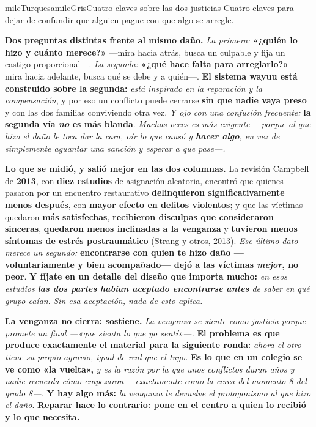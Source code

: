 \documentclass[11pt,letterpaper]{article}
\newcommand{\milcpaso}[3]{%
\Needspace{4\baselineskip}%
\begin{tcolorbox}[enhanced,colback=white,colframe=milcLinea,arc=1.5mm,boxrule=.9pt,
  left=14mm,right=4mm,top=3mm,bottom=3mm,before skip=4pt,after skip=4pt,
  fontupper=\RaggedRight,
  overlay={\node[anchor=north west,circle,fill=#2,text=white,inner sep=0pt,
    minimum size=7.4mm,font=\sffamily\bfseries\small]
    at ([xshift=3.6mm,yshift=-3.2mm]frame.north west) {#1};}]
#3
\end{tcolorbox}}
\begin{document}
\begin{softbox}{milcTurquesa}{milcGris}{Cuatro claves sobre las dos justicias}
Cuatro claves para dejar de confundir que alguien pague con que algo se arregle.
\end{softbox}

\milcpaso{1}{milcTurquesa}{\textbf{Dos preguntas distintas frente al mismo daño.} \emph{La primera:} \textbf{«¿quién lo hizo y cuánto merece?»} ---mira hacia atrás, busca un culpable y fija un castigo proporcional---. \emph{La segunda:} \textbf{«¿qué hace falta para arreglarlo?»} ---mira hacia adelante, busca qué se debe y a quién---. \textbf{El sistema wayuu está construido sobre la segunda:} \emph{está inspirado en la reparación y la compensación}, y por eso un conflicto puede cerrarse \textbf{sin que nadie vaya preso} y con las dos familias conviviendo otra vez. \emph{Y ojo con una confusión frecuente:} \textbf{la segunda vía \emph{no} es más blanda}. \emph{Muchas veces es más exigente ---porque al que hizo el daño le toca dar la cara, oír lo que causó y \textbf{hacer algo}, en vez de simplemente aguantar una sanción y esperar a que pase---.}}
\milcpaso{2}{milcTurquesa}{\textbf{Lo que se midió, y salió mejor en las dos columnas.} La revisión Campbell de \textbf{2013}, con \textbf{diez estudios} de asignación aleatoria, encontró que quienes pasaron por un encuentro restaurativo \textbf{delinquieron significativamente menos después}, con \textbf{mayor efecto en delitos violentos}; y que las víctimas quedaron \textbf{más satisfechas}, \textbf{recibieron disculpas que consideraron sinceras}, \textbf{quedaron menos inclinadas a la venganza} y \textbf{tuvieron menos síntomas de estrés postraumático} (Strang y otros, 2013). \emph{Ese último dato merece un segundo:} \textbf{encontrarse con quien te hizo daño ---voluntariamente y bien acompañado--- dejó a las víctimas \emph{mejor}, no peor}. \textbf{Y fíjate en un detalle del diseño que importa mucho:} \emph{en esos estudios \textbf{las dos partes habían aceptado encontrarse antes} de saber en qué grupo caían}. \emph{Sin esa aceptación, nada de esto aplica.}}
\milcpaso{3}{milcTurquesa}{\textbf{La venganza no cierra: sostiene.} \emph{La venganza se siente como justicia porque promete un final ---«que sienta lo que yo sentí»---.} \textbf{El problema es que produce exactamente el material para la siguiente ronda:} \emph{ahora el otro tiene su propio agravio, igual de real que el tuyo.} \textbf{Es lo que en un colegio se ve como «la vuelta»,} \emph{y es la razón por la que unos conflictos duran años y nadie recuerda cómo empezaron ---exactamente como la cerca del momento 8 del grado 8---.} \textbf{Y hay algo más:} \emph{la venganza le devuelve el protagonismo al que hizo el daño}. \textbf{Reparar hace lo contrario: pone en el centro a quien lo recibió y lo que necesita.}}
\end{document}
